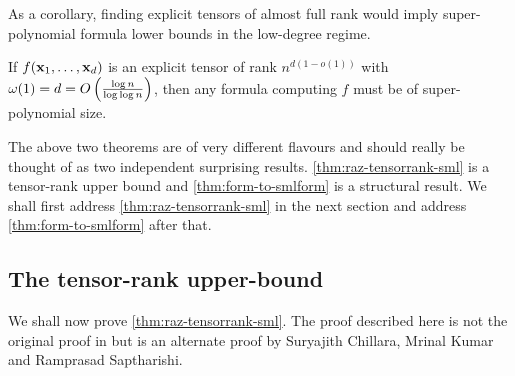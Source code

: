 As a corollary, finding explicit tensors of almost full rank would imply super-polynomial formula lower bounds in the low-degree regime.

\begin{corollary}
  If $f(\mathbf{x}_1,\ldots, \mathbf{x}_d)$ is an explicit tensor of rank $n^{d(1- o(1))}$ with $\omega(1) = d = O\left(\frac{\log n}{\log\log n}\right)$, then any formula computing $f$ must be of super-polynomial size.
\end{corollary}

The above two theorems are of very different flavours and should really be thought of as two independent surprising results.
\autoref{thm:raz-tensorrank-sml} is a tensor-rank upper bound and \autoref{thm:form-to-smlform} is a structural result.
We shall first address \autoref{thm:raz-tensorrank-sml} in the next section and address \autoref{thm:form-to-smlform} after that.

\subsection{The tensor-rank upper-bound}

We shall now prove \autoref{thm:raz-tensorrank-sml}. The proof described here is not the original proof in \cite{raz10} but is an alternate proof by Suryajith Chillara, Mrinal Kumar and Ramprasad Saptharishi. 

